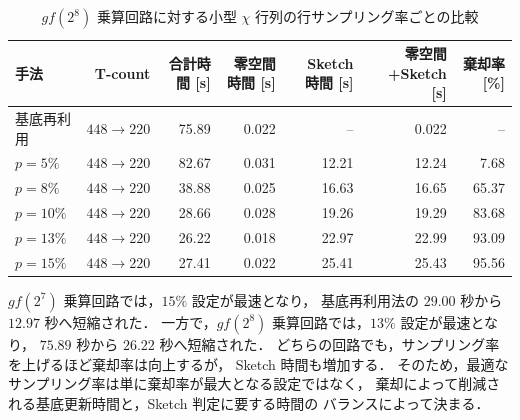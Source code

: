 \begin{table}[H]
\centering
\caption{$gf(2^8)$ 乗算回路に対する小型 $\chi$ 行列の行サンプリング率ごとの比較}
\label{tab:gf28-sketch-rate}
\begin{tabular}{lrrrrrr}
\hline
手法 & T-count & 合計時間 [s] & 零空間時間 [s] & Sketch 時間 [s] & 零空間+Sketch [s] & 棄却率 [\%] \\
\hline
基底再利用 & $448 \to 220$ & 75.89 & 0.022 & --    & 0.022 & -- \\
$p=5\%$  & $448 \to 220$ & 82.67 & 0.031 & 12.21 & 12.24 & 7.68 \\
$p=8\%$  & $448 \to 220$ & 38.88 & 0.025 & 16.63 & 16.65 & 65.37 \\
$p=10\%$ & $448 \to 220$ & 28.66 & 0.028 & 19.26 & 19.29 & 83.68 \\
$p=13\%$ & $448 \to 220$ & \cellcolor{green}26.22 & 0.018 & 22.97 & 22.99 & 93.09 \\
$p=15\%$ & $448 \to 220$ & 27.41 & 0.022 & 25.41 & 25.43 & 95.56 \\
\hline
\end{tabular}
\end{table}

$gf(2^7)$ 乗算回路では，$15\%$ 設定が最速となり，
基底再利用法の $29.00$ 秒から $12.97$ 秒へ短縮された．
一方で，$gf(2^8)$ 乗算回路では，$13\%$ 設定が最速となり，
$75.89$ 秒から $26.22$ 秒へ短縮された．
どちらの回路でも，サンプリング率を上げるほど棄却率は向上するが，
Sketch 時間も増加する．
そのため，最適なサンプリング率は単に棄却率が最大となる設定ではなく，
棄却によって削減される基底更新時間と，Sketch 判定に要する時間の
バランスによって決まる．
